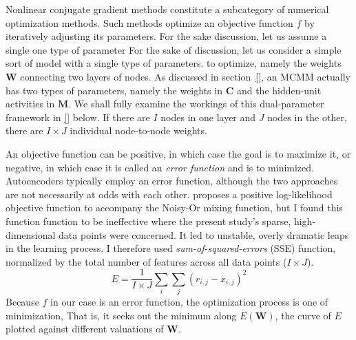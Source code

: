Nonlinear conjugate gradient methods constitute a subcategory 
of numerical optimization methods. Such methods optimize
an objective function $f$ by iteratively adjusting its parameters.
For the sake discussion, let us assume a single one type of parameter
For the sake of discussion, let us consider a simple sort of model with a single type of parameters.
to optimize, namely the weights $\textbf{W}$ connecting two layers of nodes. 
As discussed in section~\ref{},
an MCMM actually has two types of parameters, namely the weights in $\textbf{C}$ and the hidden-unit activities in $\textbf{M}$. We shall fully examine the workings of this dual-parameter framework in \ref{} below.
If there are $I$ nodes in one layer and $J$ nodes in the other, there are $I \times J$ individual node-to-node weights.

An objective function can be positive, in which case the goal is to maximize it, or negative, in which case it is
called an \emph{error function} and is to minimized. Autoencoders typically employ an error function, although the two approaches are not necessarily at odds with each other. \citet{saund:94} proposes a positive log-likelihood objective function to accompany the Noisy-Or mixing function, but I found this function function to be ineffective where the present study's sparse, high-dimensional data points were concerned. It led to unstable, overly dramatic leaps in the learning process. 
I therefore used \emph{sum-of-squared-errors} (SSE)  function, normalized by the total number of features across
all data points ($I \times J$).
\begin{equation} \label{eq:sse}
E = \frac{1}{I \times J} \sum_{i} \sum_{j} {(r_{i,j} - x_{i,j})}^2
\end{equation}
Because $f$ in our case is an error function, the optimization process is one of minimization, 
That is, it seeks out the minimum along $E(\mathbf{W})$, the curve of $E$ 
plotted against different valuations of $\mathbf{W}$.


